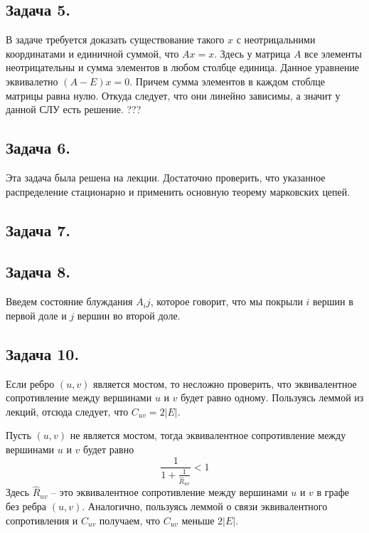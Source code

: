 \documentclass{article}
\begin{document}
\begin{enumerate}[a)]
\subsection*{Задача 5.}
В задаче требуется доказать существование такого $x$ с
неотрицальними координатами и единичной суммой, что $Ax = x$.
Здесь у матрица $A$ все элементы неотрицательны и сумма элементов
в любом столбце единица. Данное уравнение эквивалетно $(A-E)x = 0$.
Причем сумма элементов в каждом стоблце матрицы равна нулю. Откуда
следует, что они линейно зависимы, а значит у данной СЛУ есть решение.
???

\subsection*{Задача 6.}
Эта задача была решена на лекции. Достаточно проверить, что указанное
распределение стационарно и применить основную теорему марковских цепей.


\subsection*{Задача 7.}


\subsection*{Задача 8.}
Введем состояние блуждания $A_ij$, которое говорит, что мы покрыли
$i$ вершин в первой доле и $j$ вершин во второй доле.

\subsection*{Задача 10.}
Если ребро $(u,v)$ является мостом, то несложно проверить, что
эквивалентное сопротивление между вершинами $u$ и $v$ будет равно
одному. Пользуясь леммой из лекций, отсюда следует, что $C_{uv} = 2 |E|$.

Пусть $(u, v)$ не является мостом, тогда
эквивалентное сопротивление между вершинами $u$ и $v$ будет равно
$$
    \frac{1}{1 + \frac{1}{\hat{R}_{uv}}} < 1
$$
Здесь $\hat{R}_{uv}$ -- это эквивалентное сопротивление между вершинами
$u$ и $v$ в графе без ребра $(u, v)$. Аналогично, пользуясь леммой о связи
эквивалентного сопротивления и $C_{uv}$ получаем, что $C_{uv}$ меньше $2|E|$.


\end{enumerate}
\end{document}
